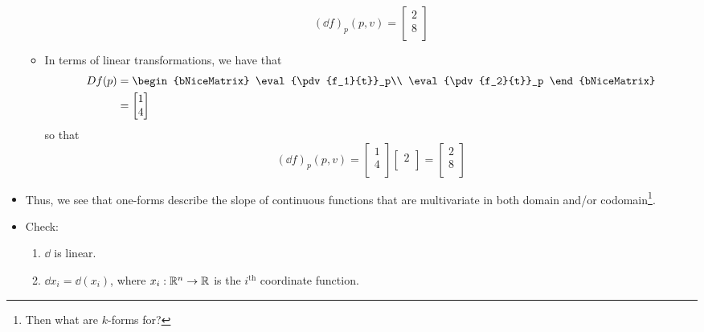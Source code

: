 \documentclass[../notes.tex]{subfiles}
\begin{document}
\begin{itemize}
\begin{itemize}
        \begin{equation*}
            (\dd{f})_p(p,v) =
            \begin{bmatrix}
                2\\
                8\\
            \end{bmatrix}
        \end{equation*}
        \item In terms of linear transformations, we have that
        \begin{align*}
            Df(p) &=
            \begin{bNiceMatrix}
                \eval{\pdv{f_1}{t}}_p\\
                \eval{\pdv{f_2}{t}}_p
            \end{bNiceMatrix}\\
            &=
            \begin{bmatrix}
                1\\
                4\\
            \end{bmatrix}
        \end{align*}
        so that
        \begin{equation*}
            (\dd{f})_p(p,v) =
            \begin{bmatrix}
                1\\
                4\\
            \end{bmatrix}
            \begin{bmatrix}
                2\\
            \end{bmatrix}
            =
            \begin{bmatrix}
                2\\
                8\\
            \end{bmatrix}
        \end{equation*}
    \end{itemize}
    \item Thus, we see that one-forms describe the slope of continuous functions that are multivariate in both domain and/or codomain\footnote{Then what are $k$-forms for?}.
    \item Check:
    \begin{enumerate}
        \item $\dd$ is linear.
        \item $\dd{x_i}=\dd{(x_i)}$, where $x_i:\mathbb{R}^n\to\mathbb{R}$ is the $i^\text{th}$ coordinate function.
    \end{enumerate}
\end{itemize}
\end{document}

